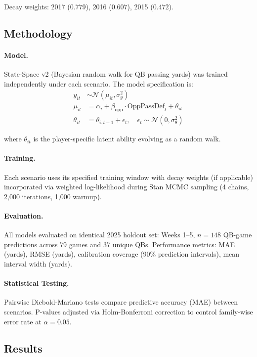 Decay weights: 2017 (0.779), 2016 (0.607), 2015 (0.472).

\subsection{Methodology}

\paragraph{Model.}
State-Space v2 (Bayesian random walk for QB passing yards) was trained independently under each scenario. The model specification is:
\begin{align}
  y_{it} &\sim \mathcal{N}(\mu_{it}, \sigma_y^2) \\
  \mu_{it} &= \alpha_i + \beta_{\text{opp}} \cdot \text{OppPassDef}_t + \theta_{it} \\
  \theta_{it} &= \theta_{i,t-1} + \epsilon_t, \quad \epsilon_t \sim \mathcal{N}(0, \sigma_\theta^2)
\end{align}

where $\theta_{it}$ is the player-specific latent ability evolving as a random walk.

\paragraph{Training.}
Each scenario uses its specified training window with decay weights (if applicable) incorporated via weighted log-likelihood during Stan MCMC sampling (4 chains, 2,000 iterations, 1,000 warmup).

\paragraph{Evaluation.}
All models evaluated on identical 2025 holdout set: Weeks 1--5, $n=148$ QB-game predictions across 79 games and 37 unique QBs. Performance metrics: MAE (yards), RMSE (yards), calibration coverage (90\% prediction intervals), mean interval width (yards).

\paragraph{Statistical Testing.}
Pairwise Diebold-Mariano tests compare predictive accuracy (MAE) between scenarios. P-values adjusted via Holm-Bonferroni correction to control family-wise error rate at $\alpha=0.05$.

\subsection{Results}

